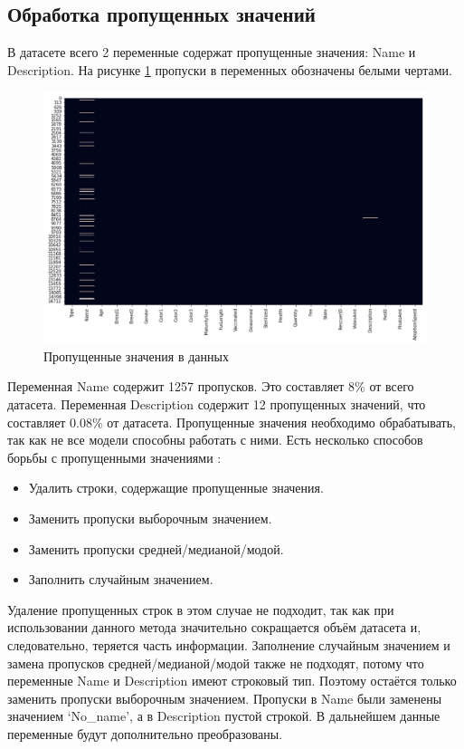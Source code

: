 \documentclass[14pt]{mmcs_article}
\begin{document}
\subsection{Обработка пропущенных значений}

В датасете всего 2 переменные содержат пропущенные значения: Name и Description. На рисунке \ref{analyse:empty} пропуски в переменных обозначены белыми чертами. 

\begin{figure}[H]
	\centering
	\includegraphics[scale=0.7]{empty.png}
	\caption{Пропущенные значения в данных}\label{analyse:empty}
\end{figure}

Переменная Name содержит 1257 пропусков. Это составляет 8\% от всего датасета. Переменная Description содержит 12 пропущенных значений, что составляет 0.08\% от датасета.
Пропущенные значения необходимо обрабатывать, так как не все модели способны работать с ними. Есть несколько способов борьбы с пропущенными значениями \cite{lib:missingdata}:
\begin{itemize}
	\item Удалить строки, содержащие пропущенные значения.
	\item Заменить пропуски выборочным значением.
	\item Заменить пропуски средней/медианой/модой.
	\item Заполнить случайным значением.
\end{itemize}

Удаление пропущенных строк в этом случае не подходит, так как при использовании данного метода значительно сокращается объём датасета и, следовательно, теряется часть информации. Заполнение случайным значением и замена пропусков средней/медианой/модой также не подходят, потому что переменные Name и Description имеют строковый тип. Поэтому остаётся только заменить пропуски выборочным значением. 
Пропуски в Name были заменены значением `No\_name', а в Description пустой строкой. В дальнейшем данные переменные будут дополнительно преобразованы.
\end{document}
